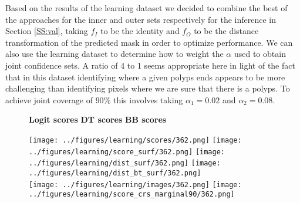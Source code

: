 Based on the results of the learning dataset we decided to combine the best of the approaches for the inner and outer sets respectively for the inference in Section \ref{SS:val}, taking $f_I$ to be the identity and $f_O$ to be the distance transformation of the predicted mask in order to optimize performance. We can also use the learning dataset to determine how to weight the $\alpha$ used to obtain joint confidence sets. A ratio of 4 to 1 seems appropriate here in light of the fact that in this dataset identifying where a given polyps ends appears to be more challenging than identifying pixels where we are sure that there is a polyps. To achieve joint coverage of $90\%$ this involves taking $\alpha_1 = 0.02$ and $\alpha_2 = 0.08$.
\begin{figure}[h!]
\hspace{4.3cm} {\fontsize{11pt}{13pt}\selectfont \textbf{Logit scores}} \hspace{1.2cm} 
{\fontsize{11pt}{13pt}\selectfont \textbf{DT scores}} \hspace{1.6cm} 
{\fontsize{11pt}{13pt}\selectfont \textbf{BB scores}}
\begin{center}
	\texttt{[image: ../figures/learning/scores/362.png]}\hspace{0.3cm}
		\texttt{[image: ../figures/learning/score\_surf/362.png]}\hspace{0.3cm}	\texttt{[image: ../figures/learning/dist\_surf/362.png]}\hspace{0.3cm}
		\texttt{[image: ../figures/learning/dist\_bt\_surf/362.png]}\hspace{0.3cm}\\
		\texttt{[image: ../figures/learning/images/362.png]}\hspace{0.3cm}
	\texttt{[image: ../figures/learning/score\_crs\_marginal90/362.png]}\hspace{0.3cm}

\end{center}
\end{figure}
